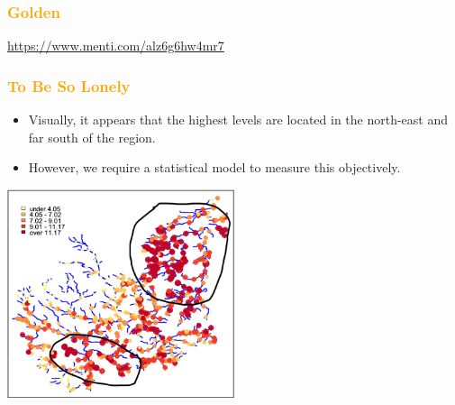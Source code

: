 \documentclass[parskip,12pt]{beamer}
\begin{document}
\begin{frame}
\frametitle{\textcolor{orange}{Golden}}
\vspace{-3mm}
\url{https://www.menti.com/alz6g6hw4mr7}
\end{frame}

\begin{frame}
\frametitle{\textcolor{orange}{To Be So Lonely}}
 \begin{itemize}
\vspace{3mm}
\item Visually, it appears that the highest levels are located in the north-east and far south of the region.
\vspace{3mm}
\item However, we require a statistical model to measure this objectively.
\end{itemize}
    \begin{center}
     \includegraphics[width=0.5\textwidth]{TrentData2}
          \end{center}
\end{frame}
\end{document}

